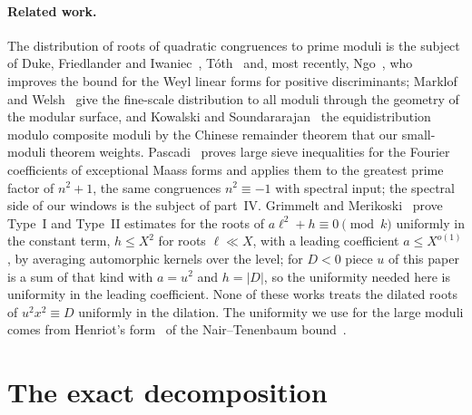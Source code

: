 \documentclass[11pt,a4paper]{article}
\theoremstyle{remark}\newtheorem{remark}[theorem]{Remark}
\begin{document}
\paragraph{Related work.} The distribution of roots of quadratic congruences to prime moduli is the subject of
Duke, Friedlander and Iwaniec~\cite{DFI1995}, T\'oth~\cite{Toth2000} and, most recently, Ngo~\cite{Ngo2024}, who
improves the bound for the Weyl linear forms for positive discriminants; Marklof and Welsh~\cite{MarklofWelsh2023} give
the fine-scale distribution to all moduli through the geometry of the modular surface, and Kowalski and
Soundararajan~\cite{KowalskiSoundararajan2021} the equidistribution modulo composite moduli by the Chinese remainder
theorem that our small-moduli theorem weights. Pascadi~\cite{Pascadi2026} proves large sieve inequalities for the
Fourier coefficients of exceptional Maass forms and applies them to the greatest prime factor of $n^2+1$, the same
congruences $n^2\equiv-1$ with spectral input; the spectral side of our windows is the subject of part~IV. Grimmelt and
Merikoski~\cite{GrimmeltMerikoski2025kernel,GrimmeltMerikoski2025quadratic} prove Type~I and Type~II estimates for the roots of
$a\ell^2+h\equiv0\pmod k$ uniformly in the constant term, $h\le X^{2}$ for roots $\ell\ll X$, with a leading coefficient $a\le X^{o(1)}$, by
averaging automorphic kernels over the level; for $D<0$ piece $u$ of this paper is a sum of that kind with $a=u^2$ and $h=|D|$, so the
uniformity needed here is uniformity in the leading coefficient. None of
these works treats the dilated roots of $u^2x^2\equiv D$ uniformly in the dilation. The uniformity we use for the large moduli
comes from Henriot's form~\cite{Henriot2012,Henriot2014} of the Nair--Tenenbaum bound~\cite{NairTenenbaum1998}.

\section{The exact decomposition}\label{sec:pieces}
\end{document}

